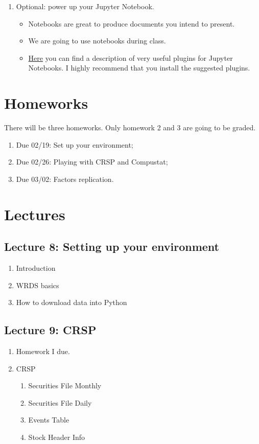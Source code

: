 \documentclass[12pts]{article}
\begin{document}
\begin{enumerate}
	\item Optional: power up your Jupyter Notebook.
	\begin{itemize}
		\item Notebooks are great to produce documents you intend to present.
		\item We are going to use notebooks during class.
		\item \href{https://towardsdatascience.com/bringing-the-best-out-of-jupyter-notebooks-for-data-science-f0871519ca29}{Here} you can find a description of very useful plugins for Jupyter Notebooks. I highly recommend that you install the suggested plugins.  
	\end{itemize}	
\end{enumerate}

\section*{Homeworks}
There will be three homeworks. Only homework 2 and 3 are going to be graded.  
\begin{enumerate}
	\item Due 02/19: Set up your environment;
	\item Due 02/26: Playing with CRSP and Compustat;
	\item Due 03/02: Factors replication.
\end{enumerate}

\section*{Lectures}

\subsection*{Lecture 8: Setting up your environment}
\begin{enumerate}
		\item Introduction
		\item WRDS basics
		\item How to download data into Python
\end{enumerate}

\subsection*{Lecture 9: CRSP}

\begin{enumerate}
	\item Homework I due.
	\item CRSP
	\begin{enumerate}
		\item Securities File Monthly 
		\item Securities File Daily 
		\item Events Table
		\item Stock Header Info
	\end{enumerate}
\end{enumerate}
\end{document}
